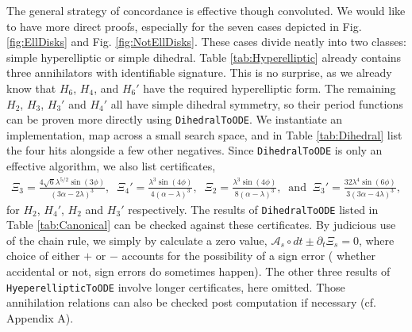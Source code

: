 \documentclass[nofootinbib,preprint]{revtex4-1}
\begin{document}
The general strategy of concordance is effective though convoluted. We would 
like to have more direct proofs, especially for the seven cases depicted in {Fig. \ref{fig:EllDisks}} and Fig. \ref{fig:NotEllDisks}. These cases divide neatly 
into two classes: simple hyperelliptic or simple dihedral. Table \ref{tab:Hyperelliptic} 
already contains three annihilators with identifiable signature. This is no surprise, 
as we already know that $H_6$, $H_4$, and $H_6'$ have the required hyperelliptic form.
The remaining $H_2$, $H_3$, $H_3'$ and $H_4'$ all have simple dihedral symmetry, 
so their period functions can be proven more directly using 
\texttt{DihedralToODE}. We instantiate an implementation, map 
across a small search space, and in Table \ref{tab:Dihedral} list the four 
hits alongside a few other negatives. Since \texttt{DihedralToODE} is only 
an effective algorithm, we also list certificates, 
\begin{eqnarray}
\Xi_3=\frac{4\sqrt{6}\lambda^{5/2}\sin(3\phi)}{(3\alpha-2\lambda)^3}, 
\;\;\Xi_4'=\frac{\lambda^{3}\sin(4\phi)}{4(\alpha-\lambda)^3}, 
\;\;\Xi_2=\frac{\lambda^{3}\sin(4\phi)}{8(\alpha-\lambda)^3}, 
\;\;\text{and}\;\; 
\Xi_3'=\frac{32\lambda^{4}\sin(6\phi)}{3(3\alpha-4\lambda)^3},
\nonumber
\end{eqnarray}
for $H_2$, $H_4'$, $H_2$ and $H_3'$ respectively. The results of 
\texttt{DihedralToODE} listed in Table \ref{tab:Canonical} can be checked 
against these certificates. By judicious use of the chain rule, we simply by 
calculate a zero value, $\mathcal{A}_s \circ dt \pm \partial_t \Xi_s=0$, where 
choice of either $+$ or $-$ accounts for the possibility of a sign error (
whether accidental or not, sign errors do sometimes happen). The other three 
results of \texttt{HyeperellipticToODE} involve longer 
certificates, here omitted. Those annihilation relations can also 
be checked post computation if necessary (cf. Appendix A).
\end{document}
